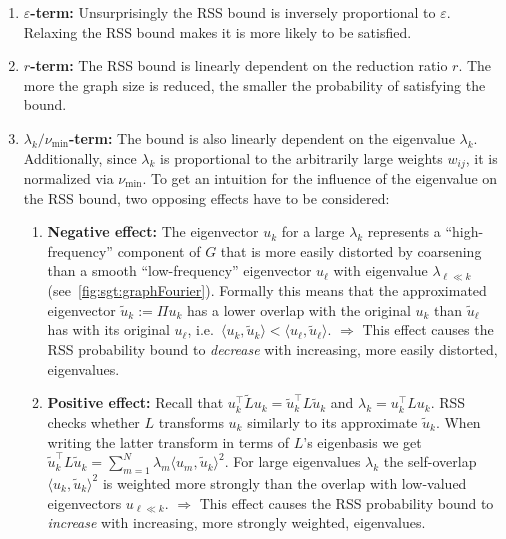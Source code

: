 \begin{enumerate}[label=\textbf{\arabic*.}]
	\item \textbf{$\varepsilon$-term:}
		Unsurprisingly the RSS bound is inversely proportional to $\varepsilon$.
		Relaxing the RSS bound makes it is more likely to be satisfied.
	\item \textbf{$r$-term:}
		The RSS bound is linearly dependent on the reduction ratio $r$.
		The more the graph size is reduced, the smaller the probability of satisfying the bound.
	\item \textbf{$\lambda_k / \nu_{\text{min}}$-term:}
		The bound is also linearly dependent on the eigenvalue $\lambda_k$.
		Additionally, since $\lambda_k$ is proportional to the arbitrarily large weights $w_{i j}$, it is normalized via $\nu_{\text{min}}$.
		To get an intuition for the influence of the eigenvalue on the RSS bound, two opposing effects have to be considered:
		\begin{enumerate}[label=(\roman*)] %
			\item \textbf{Negative effect:}\label{itm:cons:bound:neg}
				The eigenvector $u_k$ for a large $\lambda_k$ represents a ``high-frequency'' component of $G$ that is more easily distorted by coarsening than a smooth ``low-frequency'' eigenvector $u_\ell$ with eigenvalue $\lambda_{\ell \ll k}$ (see~\cref{fig:sgt:graphFourier}).
				Formally this means that the approximated eigenvector $\widetilde{u}_k := \Pi u_k$ has a lower overlap with the original $u_k$ than $\widetilde{u}_\ell$ has with its original $u_\ell$, i.e.\ $\langle u_k, \widetilde{u}_k \rangle < \langle u_\ell, \widetilde{u}_\ell \rangle$.
				$\pmb{\Rightarrow}$ This effect causes the RSS probability bound to \textit{decrease} with increasing, more easily distorted, eigenvalues.
			\item \textbf{Positive effect:}\label{itm:cons:bound:pos}
				Recall that $u_k^\top \widetilde{L} u_k = \widetilde{u}_k^\top L \widetilde{u}_k$ and $\lambda_k = u_k^\top L u_k$.
				RSS checks whether $L$ transforms $u_k$ similarly to its approximate $\widetilde{u}_k$.
				When writing the latter transform in terms of $L$'s eigenbasis we get $\widetilde{u}_k^\top L \widetilde{u}_k = \sum_{m = 1}^N \lambda_m \langle u_m, \widetilde{u}_k \rangle^2$.
				For large eigenvalues $\lambda_k$ the self-overlap $\langle u_k, \widetilde{u}_k \rangle^2$ is weighted more strongly than the overlap with low-valued eigenvectors $u_{\ell \ll k}$.
				$\pmb{\Rightarrow}$ This effect causes the RSS probability bound to \textit{increase} with increasing, more strongly weighted, eigenvalues.

\end{enumerate}
\end{enumerate}
